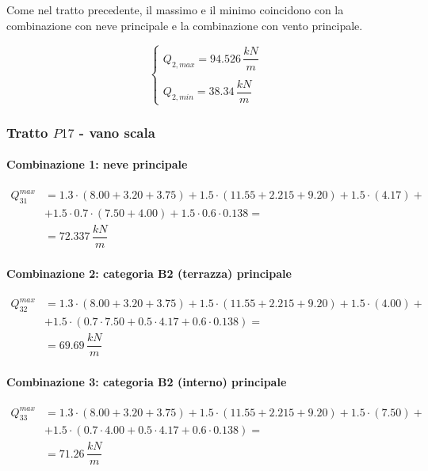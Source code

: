 Come nel tratto precedente, il massimo e il minimo coincidono con la combinazione con neve principale e la combinazione con vento principale.

\begin{equation}
		\label{eq:Q2maxmin_slu}
		\begin{cases}
			Q_{2,max} = 94.526\,\dfrac{kN}{m}\\\\
			Q_{2, min} = 38.34\,\dfrac{kN}{m}
		\end{cases}
\end{equation}

\subsubsection*{Tratto $P17$ - vano scala}

\paragraph{Combinazione 1: neve principale}

\begin{align*}
	Q_{31}^{max} &= 1.3\cdot(8.00+3.20 + 3.75) + 1.5\cdot(11.55+2.215 + 9.20) + 1.5\cdot(4.17) +\\
	&+1.5\cdot0.7\cdot(7.50+4.00) + 1.5\cdot0.6\cdot0.138 =\\
	&= 	72.337\,\dfrac{kN}{m}
\end{align*}

\paragraph{Combinazione 2: categoria B2 (terrazza) principale}

\begin{align*}
	Q_{32}^{max} &= 1.3\cdot(8.00+3.20 + 3.75) + 1.5\cdot(11.55+2.215 + 9.20) + 1.5\cdot(4.00) +\\
	&+1.5\cdot(0.7\cdot7.50+ 0.5\cdot4.17 + 0.6\cdot 0.138) =\\
	&=  69.69\,\dfrac{kN}{m}
\end{align*}

\paragraph{Combinazione 3: categoria B2 (interno) principale}

\begin{align*}
	Q_{33}^{max} &= 1.3\cdot(8.00+3.20 + 3.75) + 1.5\cdot(11.55+2.215 + 9.20) + 1.5\cdot(7.50) +\\
	&+1.5\cdot(0.7\cdot4.00+ 0.5\cdot4.17 + 0.6\cdot 0.138) =\\
	&=  71.26\,\dfrac{kN}{m}
\end{align*}

